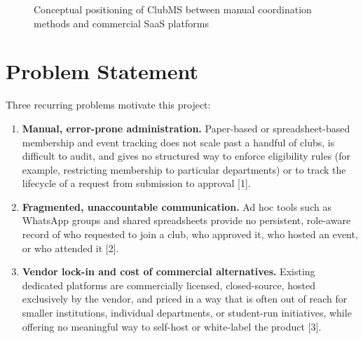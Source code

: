 \documentclass[12pt,oneside]{book}
\begin{document}
\begin{figure}[H]
\centering
{}
\caption{Conceptual positioning of ClubMS between manual coordination methods and commercial SaaS platforms}
\label{fig:1.1}
\end{figure}

\section{Problem Statement}

Three recurring problems motivate this project:

\begin{enumerate}[label=(\alph*)]
\item \textbf{Manual, error-prone administration.} Paper-based or spreadsheet-based membership and event tracking does not scale past a handful of clubs, is difficult to audit, and gives no structured way to enforce eligibility rules (for example, restricting membership to particular departments) or to track the lifecycle of a request from submission to approval [1].
\item \textbf{Fragmented, unaccountable communication.} Ad hoc tools such as WhatsApp groups and shared spreadsheets provide no persistent, role-aware record of who requested to join a club, who approved it, who hosted an event, or who attended it [2].
\item \textbf{Vendor lock-in and cost of commercial alternatives.} Existing dedicated platforms are commercially licensed, closed-source, hosted exclusively by the vendor, and priced in a way that is often out of reach for smaller institutions, individual departments, or student-run initiatives, while offering no meaningful way to self-host or white-label the product [3].
\end{enumerate}
\end{document}
